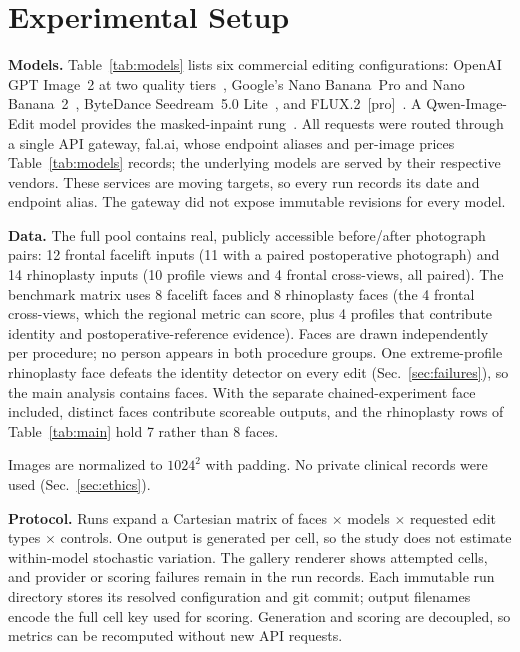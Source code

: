\section{Experimental Setup}
\label{sec:setup}

\begin{table}[t]
  \centering
  \caption{Models in the study. All run behind fal.ai; cost is the provider's
  estimate on July 16, 2026. Aliases may change after that date.}
  \label{tab:models}
  \resizebox{\columnwidth}{!}{}
\end{table}

\textbf{Models.} Table~\ref{tab:models} lists six commercial editing configurations:
OpenAI GPT Image~2 at two quality tiers~\cite{openai2026gptimage2}, Google's Nano
Banana~Pro and Nano Banana~2~\cite{google2025nanobananapro,google2026nanobanana2},
ByteDance Seedream~5.0 Lite~\cite{seedream5lite_2026,seedream4_2025}, and
FLUX.2~[pro]~\cite{bfl2025flux2,bfl2025fluxkontext}. A Qwen-Image-Edit model
provides the masked-inpaint rung~\cite{wu2025qwenimage}. All requests were
routed through a single API gateway, fal.ai, whose endpoint aliases and
per-image prices Table~\ref{tab:models} records; the underlying models are
served by their respective vendors. These services are moving targets, so
every run records its date and endpoint alias. The gateway did not expose
immutable revisions for every model.

\textbf{Data.} The full pool contains real, publicly accessible before/after
photograph pairs: 12 frontal facelift inputs (11 with a paired postoperative
photograph) and 14 rhinoplasty inputs (10 profile views and 4 frontal cross-views,
all paired). The benchmark matrix uses 8 facelift faces and 8 rhinoplasty faces
(the 4 frontal cross-views, which the regional metric can score, plus 4 profiles
that contribute identity and postoperative-reference evidence). Faces are drawn
independently per procedure; no person appears in both procedure groups. One
extreme-profile rhinoplasty face defeats the identity detector on every edit
(Sec.~\ref{sec:failures}), so the main analysis contains \NumPrimaryFaces{}
faces. With the separate chained-experiment face included, \NumFacesScored{}
distinct faces contribute scoreable outputs, and the rhinoplasty rows of
Table~\ref{tab:main} hold 7 rather than 8 faces.

Images are normalized to $1024^2$ with padding. No private clinical records
were used (Sec.~\ref{sec:ethics}).

\textbf{Protocol.} Runs expand a Cartesian matrix of faces $\times$ models
$\times$ requested edit types $\times$ controls. One output is generated per
cell, so the study does not estimate within-model stochastic variation. The gallery renderer shows attempted cells,
and provider or scoring failures remain in the run records. Each immutable run
directory stores its resolved configuration and git commit; output filenames
encode the full cell key used for scoring. Generation and scoring are decoupled,
so metrics can be recomputed without new API requests.

